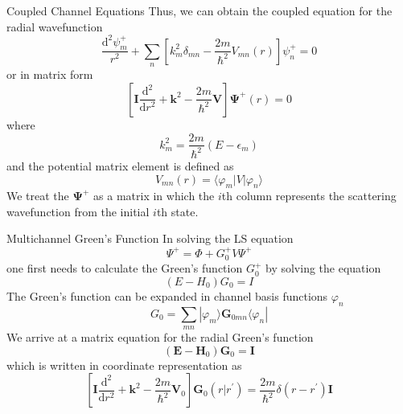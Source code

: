 \documentclass{beamer}
\begin{document}
	\begin{frame}{Coupled Channel Equations}
		Thus, we can obtain the coupled equation for the radial wavefunction
		\begin{equation}
			\dfrac{\mathrm{d}^2\psi_m^+}{r^2}+\sum\limits_n\left[ k^2_m\delta_{mn}-\dfrac{2m}{\hbar^2}V_{mn}(r)\right] \psi_n^+=0
		\end{equation}
		or in matrix form
		\begin{equation}
			\left[ \mathbf{I}\dfrac{\mathrm{d}^2}{\mathrm{d}r^2}+\mathbf{k}^2-\dfrac{2m}{\hbar^2}\mathbf{V}\right] \mathbf{\Psi^+}(r)=0
		\end{equation}
		where
		\begin{equation}
			k_m^2=\dfrac{2m}{\hbar^2}(E-\epsilon_m)
		\end{equation}
		and the potential matrix element is defined as
		\begin{equation}
			V_{mn}(r)=\langle\varphi_m|V|\varphi_n\rangle
		\end{equation}
		We treat the $\mathbf{\Psi^+}$ as a matrix in which the $i$th column represents the scattering wavefunction from the initial $i$th state.
	\end{frame}
	\begin{frame}{Multichannel Green's Function}
		In solving the LS equation
		\begin{equation}
			\Psi^+=\Phi+G_0^+V\Psi^+
		\end{equation}
		one first needs to calculate the Green's function $G_0^+$ by solving the equation
		\begin{equation}
			(E-H_0)G_0=I
		\end{equation}
		The Green's function can be expanded in channel basis functions $\varphi_n$
		\begin{equation}
			G_0=\sum\limits_{mn}|\varphi_m\rangle\mathbf{G}_{0mn}\langle\varphi_n|
		\end{equation}
		We arrive at a matrix equation for the radial Green's function
		\begin{equation}
			(\mathbf{E}-\mathbf{H}_0)\mathbf{G}_0=\mathbf{I}
		\end{equation}
		which is written in coordinate representation as
		\begin{equation}
			\left[ \mathbf{I}\dfrac{\mathrm{d}^2}{\mathrm{d}r^2}+\mathbf{k}^2-\dfrac{2m}{\hbar^2}\mathbf{V}_0\right] \mathbf{G}_0(r|r^\prime)=\dfrac{2m}{\hbar^2}\delta(r-r^\prime)\mathbf{I}
		\end{equation}
	\end{frame}
\end{document}

